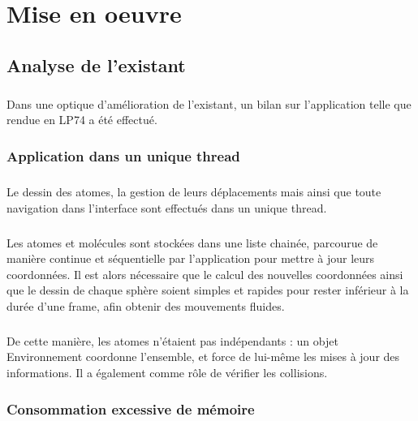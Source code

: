 \chapter{Mise en oeuvre}
\label{mise_en_oeuvre}

\section{Analyse de l'existant}

\paragraph{}
Dans une optique d'amélioration de l'existant, un bilan sur l'application telle
que rendue en LP74 a été effectué.


\subsection{Application dans un unique thread}

\paragraph{}
Le dessin des atomes, la gestion de leurs déplacements mais ainsi que toute
navigation dans l'interface sont effectués dans un unique thread.

\paragraph{}
Les atomes et molécules sont stockées dans une liste chainée, parcourue de
manière continue et séquentielle par l'application pour mettre à jour leurs
coordonnées. Il est alors nécessaire que le calcul des nouvelles coordonnées
ainsi que le dessin de chaque sphère soient simples et rapides pour rester
inférieur à la durée d'une frame, afin obtenir des mouvements fluides.

\paragraph{}
De cette manière, les atomes n'étaient pas indépendants : un objet
Environnement coordonne l'ensemble, et force de lui-même les mises à jour des
informations.  Il a également comme rôle de vérifier les collisions.


\subsection{Consommation excessive de mémoire}

